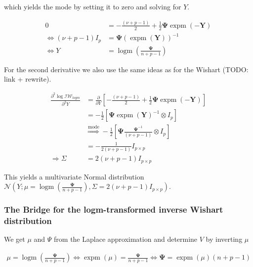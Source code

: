 which yields the mode by setting it to zero and solving for $Y$.

\begin{subequations}
\begin{align}
	0 &= -\frac{(\nu+p-1)}{2} + \frac{1}{2}\mathbf\Psi\operatorname{expm}(\mathbf{-Y}) \\
	\Leftrightarrow (\nu+p-1) I_p &=  \mathbf\Psi(\operatorname{expm}(\mathbf{Y}))^{-1} \\
	\Leftrightarrow Y &= \operatorname{logm}\left(\frac{\mathbf\Psi}{n+p-1}\right)
\end{align}
\end{subequations}

For the second derivative we also use the same ideas as for the Wishart (TODO: link + rewrite). 

\begin{subequations}
\begin{align}
	\frac{\partial^2 \log \mathcal{IW}_{logm}}{\partial^2 Y} &= \frac{\partial }{\partial Y} \left[-\frac{(\nu+p-1)}{2} + \frac{1}{2}\mathbf\Psi\operatorname{expm}(\mathbf{-Y}) \right] \\
	&= -\frac{1}{2}\left[\mathbf\Psi\operatorname{expm}(\mathbf{Y})^{-1} \otimes I_p\right] \\
	&\overset{\text{mode}}{\Rightarrow} -\frac{1}{2}\left[\mathbf\Psi\frac{\mathbf\Psi^{-1}}{(\nu+p-1)} \otimes I_p\right] \\
	&= -\frac{1}{2(\nu+p-1)} I_{p\times p} \\
	\Rightarrow \Sigma &= 2(\nu+p-1) I_{p\times p}
\end{align}
\end{subequations}

This yields a multivariate Normal distribution $\mathcal{N}\left(Y; \mu = \operatorname{logm}\left(\frac{\mathbf\Psi}{n+p-1}\right), \Sigma = 2(\nu+p-1) I_{p\times p}\right)$. 

\subsubsection{The Bridge for the logm-transformed inverse Wishart distribution}

We get $\mu$ and $\Psi$ from the Laplace approximation and determine $V$ by inverting $\mu$

\begin{subequations}
\begin{align}
	\mu = \operatorname{logm}\left(\frac{\mathbf\Psi}{n+p-1}\right) \Leftrightarrow \operatorname{expm}(\mu) = \frac{\mathbf\Psi}{n+p-1} \Leftrightarrow \mathbf\Psi = \operatorname{expm}(\mu)(n+p-1)
\end{align}
\end{subequations}

